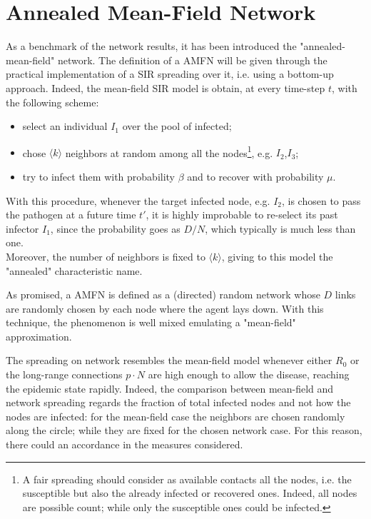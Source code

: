 \documentclass[a4paper,12pt,twoside]{book} %
\theoremstyle{definition}
\begin{document}
\section*{Annealed Mean-Field Network}
\label{sec:Annealed_MF_Network}
As a benchmark of the network results, it has been introduced the "annealed-mean-field" network. %
The definition of a AMFN will be given through the practical implementation of a SIR spreading over it, i.e. using a bottom-up approach.
Indeed, the mean-field SIR model is obtain, at every time-step $t$, with the following scheme: 
\begin{itemize}
	\item select an individual $I_1$ over the pool of infected;
	\item chose $\langle k \rangle$ neighbors at random among all the nodes\footnote{A fair spreading should consider as available contacts all the nodes, i.e. the susceptible but also the already infected or recovered ones. Indeed, all nodes are possible count; while only the susceptible ones could be infected.}, e.g. $I_2$,$I_3$;
	\item try to infect them with probability $\beta$ and to recover with probability $\mu$.
\end{itemize}
With this procedure, whenever the target infected node, e.g. $I_2$, is chosen to pass the pathogen at a future time $t'$, it is highly improbable to re-select its past infector $I_1$, since the probability goes as $D/N$, which typically is much less than one. 
\\Moreover, the number of neighbors is fixed to $\langle k \rangle$, giving to this model the "annealed" characteristic name.

As promised, a AMFN is defined as a (directed) random network whose $D$ links are randomly chosen by each node where the agent lays down. With this technique, the phenomenon is well mixed emulating a "mean-field" approximation.

The spreading on network resembles the mean-field model whenever either $R_0$ or the long-range connections $p \cdot N$ are high enough to allow the disease, reaching the epidemic state rapidly. Indeed, the comparison between mean-field and network spreading regards the fraction of total infected nodes and not how the nodes are infected: for the mean-field case the neighbors are chosen randomly along the circle; while they are fixed for the chosen network case. For this reason, there could an accordance in the measures considered.
\end{document}
